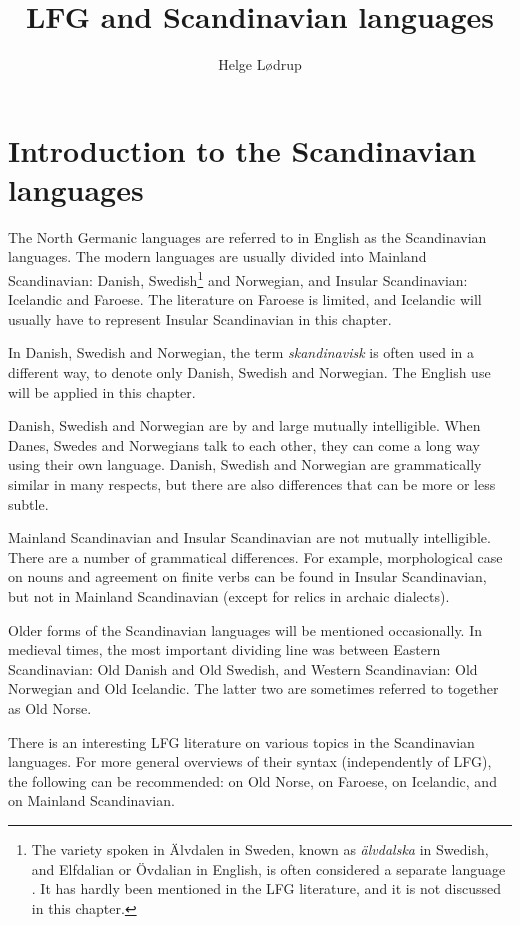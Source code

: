 \documentclass[output=paper,hidelinks]{langscibook}
\title{LFG and Scandinavian languages}
\author{Helge Lødrup\affiliation{University of Oslo}}
\begin{document}
\maketitle
\label{chap:Scandinavian}

\section{Introduction to the Scandinavian languages}

The North Germanic languages are referred to in English as the Scandinavian languages. The modern languages are usually divided into Mainland Scandinavian: Danish, Swedish\footnote{The variety spoken in Älvdalen in Sweden, known as \textit{älvdalska} in Swedish, and Elfdalian or Övdalian in English, is often considered a separate language \citep{Garbacz09}. It has hardly been mentioned in the LFG literature, and it is not discussed in this chapter.} and Norwegian, and Insular Scandinavian: Icelandic and Faroese. The literature on Faroese is limited, and Icelandic will usually have to represent Insular Scandinavian in this chapter.

 In Danish, Swedish and Norwegian, the term \textit{skandinavisk} is often used in a different way, to denote only Danish, Swedish and Norwegian. The English use will be applied in this chapter.

 Danish, Swedish and Norwegian are by and large mutually intelligible. When Danes, Swedes and Norwegians talk to each other, they can come a long way using their own language. Danish, Swedish and Norwegian are grammatically similar in many respects, but there are also differences that can be more or less subtle.

 Mainland Scandinavian and Insular Scandinavian are not mutually intelligible. There are a number of grammatical differences. For example, morphological case on nouns and agreement on finite verbs can be found in Insular Scandinavian, but not in Mainland Scandinavian (except for relics in archaic dialects).

 Older forms of the Scandinavian languages will be mentioned occasionally. In medieval times, the most important dividing line was between Eastern Scandinavian: Old Danish and Old Swedish, and Western Scandinavian: Old Norwegian and Old Icelandic. The latter two are sometimes referred to together as Old Norse.

 There is an interesting LFG literature on various topics in the Scandinavian languages. For more general overviews of their syntax (independently of LFG), the following can be recommended: \citet{Faarlund04} on Old Norse, \citet{TPJH04} on Faroese, \citet{Thrainsson07} on Icelandic, and \citet{Faarlund19} on Mainland Scandinavian.
\end{document}

